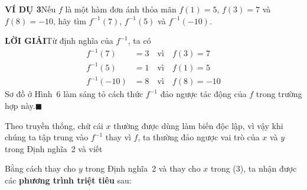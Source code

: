 \begin{minipage}[t]{0.708\textwidth}
    \fontsize{9.3pt}{13.2pt}\selectfont
    \vspace*{0pt}
    \noindent
    \textbf{\textsf{\color{stewartcyan}VÍ DỤ 3}}\quad Nếu $f$ là một hàm đơn ánh thỏa mãn $f(1) = 5$, $f(3) = 7$ và $f(8) = -10$, hãy tìm $f^{-1}(7)$, $f^{-1}(5)$ và $f^{-1}(-10)$.

    \vspace{4pt}
    \noindent
    \textbf{\textsf{\color{stewartcyan}LỜI GIẢI}}\quad Từ định nghĩa của $f^{-1}$, ta có
    \begin{align*}
        f^{-1}(7) &= 3 \quad \text{vì} \quad f(3) = 7 \\
        f^{-1}(5) &= 1 \quad \text{vì} \quad f(1) = 5 \\
        f^{-1}(-10) &= 8 \quad \text{vì} \quad f(8) = -10
    \end{align*}
    Sơ đồ ở Hình~6 làm sáng tỏ cách thức $f^{-1}$ đảo ngược tác động của $f$ trong trường hợp này.\hfill{\color{stewartcyan}$\blacksquare$}

    \vspace{6pt}
    Theo truyền thống, chữ cái $x$ thường được dùng làm biến độc lập, vì vậy khi chúng ta tập trung vào $f^{-1}$ thay vì $f$, ta thường đảo ngược vai trò của $x$ và $y$ trong Định nghĩa~2 và viết

    \vspace{4pt}
    \begin{center}
    \begin{minipage}{0.95\linewidth}
      \centering
    \end{minipage}
    \end{center}

    \vspace{4pt}
    Bằng cách thay cho $y$ trong Định nghĩa~2 và thay cho $x$ trong (3), ta nhận được các \textbf{phương trình triệt tiêu} sau:

    \vspace{4pt}
    \begin{center}
    \begin{minipage}{0.95\linewidth}
      \centering
    \end{minipage}
    \end{center}


\end{minipage}
